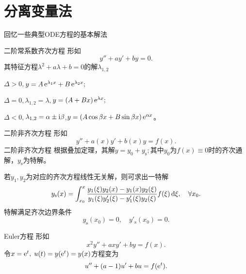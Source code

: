 \chapter{分离变量法}
回忆一些典型ODE方程的基本解法
\begin{method}{二阶常系数齐次方程}{}
	形如
	\begin{equation}
		y'' + ay' + by = 0.
	\end{equation}
	其特征方程$\lambda^2 + a\lambda + b = 0$的解$\lambda_{1,2}$
	\begin{compactenum}[I.]
		\item $\Delta > 0,$\quad$y = A\mathop{}\!\mathrm{e}^{\lambda_1x} + B\mathop{}\!\mathrm{e}^{\lambda_2x};$
		\item $\Delta = 0,$\quad$\lambda_{1,2} = \lambda,$\quad$y = (A + Bx)\mathop{}\!\mathrm{e}^{\lambda x};$
		\item $\Delta < 0,$\quad$\lambda_{1,2} = \alpha \pm \mathrm{i}\beta$,\quad$y = (A\cos\beta x + B\sin\beta x)\mathop{}\!\mathrm{e}^{\alpha x}$。
	\end{compactenum}
\end{method}
\begin{method}{二阶非齐次方程}{}
	形如
	\begin{equation}
		y'' + a(x)y' + b(x)y = f(x).
	\end{equation}
	二阶非齐次方程
	根据叠加定理，其解$y = y_0 + y_\mathrm s;$其中$y_0$为$f(x) \equiv 0$时的齐次通解，$y_\mathrm s$为特解。
	
	若$y_1,y_2$为对应的齐次方程线性无关解，则可求出一特解
	\begin{align}\label{General to Particular Solution}
		y_\mathrm s(x) = \int_{x_0}^x\frac{y_1(\xi)y_2(x) - y_1(x)y_2(\xi)}{y_1(\xi)y_2'(\xi) - y_1'(\xi)y_2(\xi)}f(\xi)\mathop{}\!\mathrm{d} \xi,\quad\forall x_0.
	\end{align}
	特解满足齐次边界条件
	\[
		y_\mathrm s(x_0) = 0,\quad y'_\mathrm s(x_0) = 0.
	\]
\end{method}
\begin{method}{Euler方程}{}
	形如
	\begin{equation}
		x^2y'' + axy' + by = f(x).
	\end{equation}
	令$x = \mathop{}\!\mathrm{e}^t,\;u(t) = y(\mathop{}\!\mathrm{e}^t) = y(x)$方程变为
	\begin{align}
		u'' + (a - 1)u' + bu = f(\mathop{}\!\mathrm{e}^t).
	\end{align}
\end{method}

